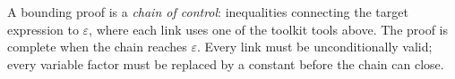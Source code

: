 \begin{remark}
A bounding proof is a \emph{chain of control}: inequalities connecting the
target expression to $\varepsilon$, where each link uses one of the toolkit
tools above. The proof is complete when the chain reaches $\varepsilon$.
Every link must be unconditionally valid; every variable factor must be
replaced by a constant before the chain can close.
\end{remark}
